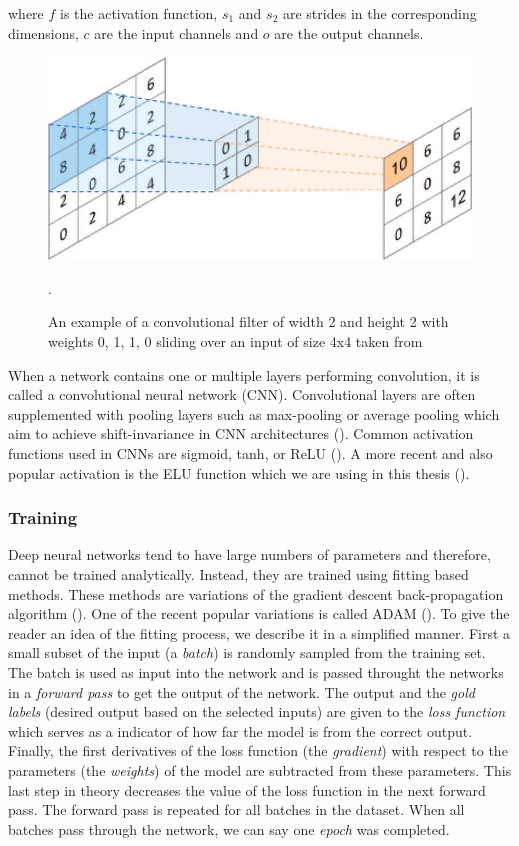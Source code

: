 where $f$ is the activation function, $s_1$ and $s_2$ are strides in the corresponding dimensions, $c$ are the input channels and $o$ are the output channels.

\begin{figure}[!htpb]
\centering
   \includegraphics[width=0.8\linewidth]{img/ch2/convolution}
   \caption[Convolutional filter]{An example of a convolutional filter of width 2 and height 2 with weights 0, 1, 1, 0 sliding over an input of size 4x4 taken from~\cite{conv-diagram}}.
\label{fig:convolution}
\end{figure}

When a network contains one or multiple layers performing convolution, it is called a convolutional neural network (CNN).
Convolutional layers are often supplemented with pooling layers such as max-pooling or average pooling which aim to achieve shift-invariance in CNN architectures (\cite{cnn-description}). 
Common activation functions used in CNNs are sigmoid, tanh, or ReLU (\cite{relu-paper}).
A more recent and also popular activation is the ELU function which we are using in this thesis (\cite{clevert-elu-2016}). 

\subsubsection{Training}
Deep neural networks tend to have large numbers of parameters and therefore, cannot be trained analytically.
Instead, they are trained using fitting based methods.
These methods are variations of the gradient descent back-propagation algorithm (\cite{back-prop}).
One of the recent popular variations is called ADAM (\cite{kingma-adam-2017}).
To give the reader an idea of the fitting process, we describe it in a simplified manner. 
First a small subset of the input (a \textit{batch}) is randomly sampled from the training set. 
The batch is used as input into the network and is passed throught the networks in a \textit{forward pass} to get the output of the network. 
The output and the \textit{gold labels} (desired output based on the selected inputs) are given to the \textit{loss function} which serves as a indicator of how far the model is from the correct output. 
Finally, the first derivatives of the loss function (the \textit{gradient}) with respect to the parameters (the \textit{weights}) of the model are subtracted from these parameters.
This last step in theory decreases the value of the loss function in the next forward pass.
The forward pass is repeated for all batches in the dataset.
When all batches pass through the network, we can say one \textit{epoch} was completed.

